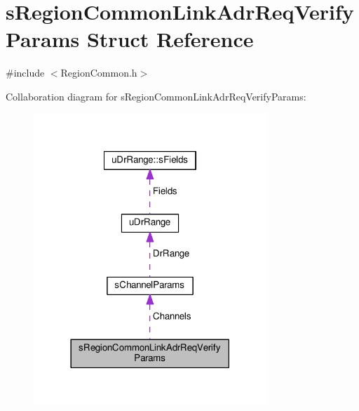 \hypertarget{structsRegionCommonLinkAdrReqVerifyParams}{}\section{s\+Region\+Common\+Link\+Adr\+Req\+Verify\+Params Struct Reference}
\label{structsRegionCommonLinkAdrReqVerifyParams}


{\ttfamily \#include $<$Region\+Common.\+h$>$}



Collaboration diagram for s\+Region\+Common\+Link\+Adr\+Req\+Verify\+Params\+:
\nopagebreak
\begin{figure}[H]
\begin{center}
\leavevmode
\includegraphics[width=249pt]{structsRegionCommonLinkAdrReqVerifyParams__coll__graph}
\end{center}
\end{figure}

